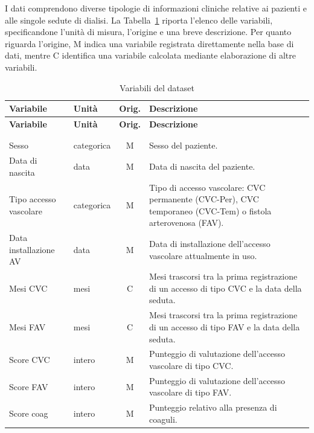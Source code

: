 \documentclass[a4paper,12pt]{report}
\begin{document}
I dati comprendono diverse tipologie di informazioni cliniche relative ai pazienti e alle singole sedute di dialisi. La Tabella~\ref{tab:variabili} riporta l'elenco delle variabili, specificandone l'unità di misura, l'origine e una breve descrizione. Per quanto riguarda l'origine, M indica una variabile registrata direttamente nella base di dati, mentre C identifica una variabile calcolata mediante elaborazione di altre variabili.

\providecommand{\V}[1]{\ensuremath{\text{#1}}}

\small
\renewcommand{\arraystretch}{1.2}
\begin{longtable}{@{}>{\raggedright\arraybackslash}p{3.1cm}
                   >{\raggedright\arraybackslash}p{2.4cm}
                   c
                   >{\raggedright\arraybackslash}p{7.0cm}@{}}
\caption{Variabili del dataset}
\label{tab:variabili}\\
\toprule
\textbf{Variabile} & \textbf{Unità} & \textbf{Orig.} & \textbf{Descrizione} \\
\midrule
\endfirsthead
\toprule
\textbf{Variabile} & \textbf{Unità} & \textbf{Orig.} & \textbf{Descrizione} \\
\midrule
\endhead
\midrule
\multicolumn{4}{r}{\emph{continua nella pagina successiva}} \\
\endfoot
\bottomrule
\endlastfoot

\multicolumn{4}{@{}l}{\textbf{Anagrafica e accesso vascolare}} \\
\midrule
Sesso & categorica & M & Sesso del paziente. \\
Data di nascita & data & M & Data di nascita del paziente. \\
Tipo accesso vascolare & categorica & M & Tipo di accesso vascolare: CVC permanente (CVC-Per), CVC temporaneo (CVC-Tem) o fistola arterovenosa (FAV). \\
Data installazione AV & data & M & Data di installazione dell'accesso vascolare attualmente in uso. \\
Mesi CVC & mesi & C & Mesi trascorsi tra la prima registrazione di un accesso di tipo CVC e la data della seduta. \\
Mesi FAV & mesi & C & Mesi trascorsi tra la prima registrazione di un accesso di tipo FAV e la data della seduta. \\
Score CVC & intero & M & Punteggio di valutazione dell'accesso vascolare di tipo CVC. \\
Score FAV & intero & M & Punteggio di valutazione dell'accesso vascolare di tipo FAV. \\
Score coag & intero & M & Punteggio relativo alla presenza di coaguli. \\
\midrule


\end{longtable}
\end{document}
